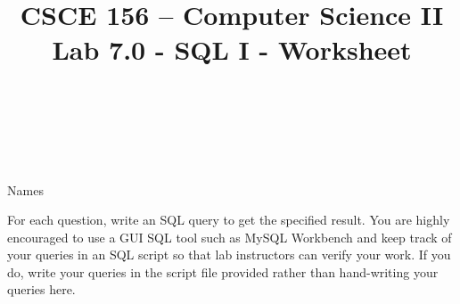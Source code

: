 \documentclass[12pt]{exam}
\title{CSCE 156 -- Computer Science II \\
{\large Lab 7.0 - SQL I - Worksheet}}
\author{~}
\date{~}
\begin{document}
\maketitle

{\Large Names \underline{\hspace*{5cm}}}

For each question, write an SQL query to get the specified result.  You are highly 
encouraged to use a GUI SQL tool such as MySQL Workbench and keep track of your 
queries in an SQL script so that lab instructors can verify your work.  If you do, 
write your queries in the script file provided rather than hand-writing your queries 
here.

\end{document}

